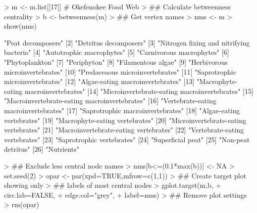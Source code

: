 \documentclass[article]{jss}
\begin{document}
\begin{Schunk}
\begin{Sinput}
> m <- m.list[[17]]  # Okefenokee Food Web
> ## Calculate betweenness centrality
> b <- betweenness(m)
> ## Get vertex names
> nms <- m%
> show(nms)
\end{Sinput}
\begin{Soutput}
 [1] "Peat decomposers"                           
 [2] "Detritus decomposers"                       
 [3] "Nitrogen fixing and nitrifying bacteria"    
 [4] "Autotrophic macrophytes"                    
 [5] "Carnivorous macrophytes"                    
 [6] "Phytoplankton"                              
 [7] "Periphyton"                                 
 [8] "Filamentous algae"                          
 [9] "Herbivorous microinvertebrates"             
[10] "Predaceaous microinvertebrates"             
[11] "Saprotrophic microinvertebrates"            
[12] "Algae-eating macroinvertebrates"            
[13] "Macrophyte-eating macroinvertebrates"       
[14] "Microinvertebrate-eating macroinvertebrates"
[15] "Macroinvertebrate-eating macroinvertebrates"
[16] "Vertebrate-eating macroinvertebrates"       
[17] "Saprotrophic macroinvertebrates"            
[18] "Algae-eating vertebrates"                   
[19] "Macrophyte-eating vertebrates"              
[20] "Microinvertebrate-eating vertebrates"       
[21] "Macroinvertebrate-eating vertebrates"       
[22] "Vertebrate-eating vertebrates"              
[23] "Saprotrophic vertebrates"                   
[24] "Superficial peat"                           
[25] "Non-peat detritus"                          
[26] "Nutrients"                                  
\end{Soutput}
\begin{Sinput}
> ## Exclude less central node names
> nms[b<=(0.1*max(b))] <- NA
> set.seed(2)
> opar <- par(xpd=TRUE,mfrow=c(1,1))
> ## Create target plot showing only
> ## labels of most central nodes
> gplot.target(m,b,
+               circ.lab=FALSE,
+               edge.col="grey",
+               label=nms)
> ## Remove plot settings
> rm(opar)
\end{Sinput}
\end{Schunk}
\end{document}
